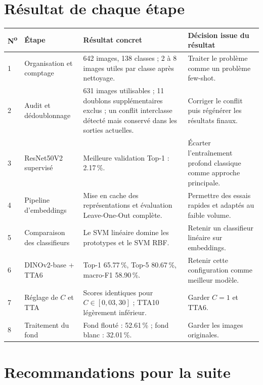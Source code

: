 \documentclass[12pt,a4paper]{report}
\newcommand{\pct}[1]{\num{#1}\,\%}
\begin{document}
\chapter{Résultat de chaque étape}

\begin{longtable}{p{}p{}p{}p{}}
\toprule
\textbf{N\textsuperscript{o}} & \textbf{Étape} & \textbf{Résultat concret} & \textbf{Décision issue du résultat}\\
\midrule
\endhead
1 & Organisation et comptage & 642 images, 138 classes ; 2 à 8 images utiles par classe après nettoyage. & Traiter le problème comme un problème few-shot.\\
2 & Audit et dédoublonnage & 631 images utilisables ; 11 doublons supplémentaires exclus ; un conflit interclasse détecté mais conservé dans les sorties actuelles. & Corriger le conflit puis régénérer les résultats finaux.\\
3 & ResNet50V2 supervisé & Meilleure validation Top-1 : \pct{2,17}. & Écarter l'entraînement profond classique comme approche principale.\\
4 & Pipeline d'embeddings & Mise en cache des représentations et évaluation Leave-One-Out complète. & Permettre des essais rapides et adaptés au faible volume.\\
5 & Comparaison des classifieurs & Le SVM linéaire domine les prototypes et le SVM RBF. & Retenir un classifieur linéaire sur embeddings.\\
6 & DINOv2-base + TTA6 & Top-1 \pct{65,77}, Top-5 \pct{80,67}, macro-F1 \pct{58,90}. & Retenir cette configuration comme meilleur modèle.\\
7 & Réglage de $C$ et TTA & Scores identiques pour $C\in[0{,}03,30]$ ; TTA10 légèrement inférieur. & Garder $C=1$ et TTA6.\\
8 & Traitement du fond & Fond flouté : \pct{52,61} ; fond blanc : \pct{32,01}. & Garder les images originales.\\
\bottomrule
\end{longtable}

\chapter{Recommandations pour la suite}
\end{document}
